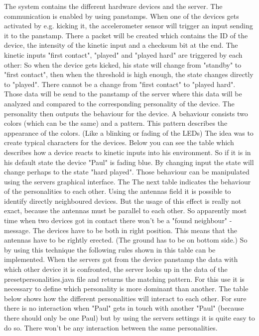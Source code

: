 The system contains the different hardware devices and the server. The communication is enabled by using panstamps. When one of the devices gets activated by e.g. kicking it, the accelerometer sensor will trigger an input sending it to the panstamp. There a packet will be created which contains the ID of the device, the intensity of the kinetic input and a checksum bit at the end.
The kinetic inputs "first contact", "played" and "played hard" are triggered by each other:
So when the device gets kicked, his state will change from "standby" to "first contact", then when the threshold is high enough, the state changes directly to "played". There cannot be a change from "first contact" to "played hard". 
Those data will be send to the panstamp of the server where this data will be analyzed and compared to the corresponding personality of the device. The personality then outputs the behaviour for the device. A behaviour consists two colors (which can be the same) and a pattern. This pattern describes the appearance of the colors. (Like a blinking or fading of the LEDs)
The idea was to create typical characters for the devices. Below you can see the table which describes how a device reacts to kinetic inputs into his environment. So if it is in his default state the device "Paul" is fading blue. By changing input the state will change perhaps to the state "hard played". Those behaviour can be manipulated using the servers graphical interface. The %
The next table indicates the behaviour of the personalities to each other. Using the antennas field  it is possible to identify directly neighboured devices. But the usage of this effect is really not exact, because the antennas must be parallel to each other. So apparently most time when two devices got in contact there won't be a "found neighbour" - message. The devices have to be both in right position. This means that the antennas have to be rightly erected. (The ground has to be on bottom side.)   
So by using this technique the following rules shown in this table can be implemented.
When the servers got from the device panstamp the data with which other device it is confronted, the server looks up in the data of the presetpersonalities.java file and returns the matching pattern. For this use it is necessary to define which personality is more dominant than another.
The table below shows how the different personalities will interact to each other.
For sure there is no interaction when "Paul" gets in touch with another "Paul" (because there should only be one Paul) but by using the servers settings it is quite easy to do so. There won't be any interaction between the same personalities.

